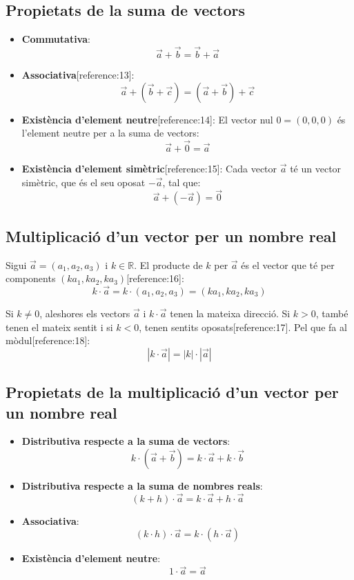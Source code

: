 \documentclass[12pt]{article}
\begin{document}
\subsection{Propietats de la suma de vectors}
\begin{concept}
\begin{itemize}
    \item \textbf{Commutativa}: 
    \[
    \vec{a} + \vec{b} = \vec{b} + \vec{a}
    \]
    \item \textbf{Associativa}[reference:13]:
    \[
    \vec{a} + (\vec{b} + \vec{c}) = (\vec{a} + \vec{b}) + \vec{c}
    \]
    \item \textbf{Existència d'element neutre}[reference:14]: El vector nul $0 = (0,0,0)$ és l'element neutre per a la suma de vectors:
    \[
    \vec{a} + \vec{0} = \vec{a}
    \]
    \item \textbf{Existència d'element simètric}[reference:15]: Cada vector $\vec{a}$ té un vector simètric, que és el seu oposat $-\vec{a}$, tal que:
    \[
    \vec{a} + (-\vec{a}) = \vec{0}
    \]
\end{itemize}
\end{concept}

\subsection{Multiplicació d'un vector per un nombre real}

\begin{concept}
Sigui $\vec{a} = (a_1, a_2, a_3)$ i $k \in \mathbb{R}$. El producte de $k$ per $\vec{a}$ és el vector que té per components $(ka_1, ka_2, ka_3)$[reference:16]:
\[
k \cdot \vec{a} = k \cdot (a_1, a_2, a_3) = (ka_1, ka_2, ka_3)
\]

Si $k \neq 0$, aleshores els vectors $\vec{a}$ i $k \cdot \vec{a}$ tenen la mateixa direcció. Si $k > 0$, també tenen el mateix sentit i si $k < 0$, tenen sentits oposats[reference:17]. Pel que fa al mòdul[reference:18]:
\[
|k \cdot \vec{a}| = |k| \cdot |\vec{a}|
\]
\end{concept}

\subsection{Propietats de la multiplicació d'un vector per un nombre real}

\begin{concept}
\begin{itemize}
    \item \textbf{Distributiva respecte a la suma de vectors}:
    \[
    k \cdot (\vec{a} + \vec{b}) = k \cdot \vec{a} + k \cdot \vec{b}
    \]
    \item \textbf{Distributiva respecte a la suma de nombres reals}:
    \[
    (k + h) \cdot \vec{a} = k \cdot \vec{a} + h \cdot \vec{a}
    \]
    \item \textbf{Associativa}:
    \[
    (k \cdot h) \cdot \vec{a} = k \cdot (h \cdot \vec{a})
    \]
    \item \textbf{Existència d'element neutre}:
    \[
    1 \cdot \vec{a} = \vec{a}
    \]
\end{itemize}
\end{concept}
\end{document}
